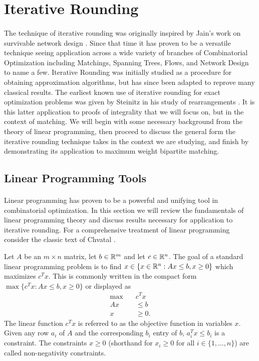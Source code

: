 \section{Iterative Rounding}
\paragraph{}
The technique of iterative rounding was originally inspired by Jain's work on survivable network design \cite{jain2001factor}. Since that time it has proven to be a versatile technique seeing application across a wide variety of branches of Combinatorial Optimization including Matchings, Spanning Trees, Flows, and Network Design \cite{lau2011iterative} to name a few. Iterative Rounding was initially studied as a procedure for obtaining approximation algorithms, but has since been adapted to reprove many classical results. The earliest known use of iterative rounding for exact optimization problems was given by Steinitz in his study of rearrangements \cite{steinitz1913bedingt}. It is this latter application to proofs of integrality that we will focus on, but in the context of matching. We will begin with some necessary background from the theory of linear programming, then proceed to discuss the general form the iterative rounding technique takes in the context we are studying, and finish by demonstrating its application to maximum weight bipartite matching.
\subsection{Linear Programming Tools}\label{IR:LP}
\paragraph{}
Linear programming has proven to be a powerful and unifying tool in combinatorial optimization. In this section we will review the fundamentals of linear programming theory and discuss results necessary for application to iterative rounding. For a comprehensive treatment of linear programming consider the classic text of Chvatal \cite{chvatal1983linear}.
\begin{definition}
Let $A$ be an $m \times n$ matrix, let $b \in \mathbb{R}^m$ and let $c \in \mathbb{R}^n$. The goal of a standard linear programming problem is to find $x \in \{x \in \mathbb{R}^n : Ax \leq b, x \geq 0 \}$ which maximizes $c^Tx$. This is commonly written in the compact form $\max\{c^Tx : Ax \leq b, x \geq 0 \}$ or displayed as
\begin{align*}
\max\quad &c^Tx \\
Ax &\leq b \\
x &\geq 0.
\end{align*}
The linear function $c^Tx$ is referred to as the objective function in variables $x$. Given any row $a_i$ of $A$ and the corresponding $b_i$ entry of $b$, $a_i^Tx \leq b_i$ is a constraint. The constraints $x \geq 0$ (shorthand for $x_i \geq 0$ for all $i \in \{1, \dots, n\}$) are called non-negativity constraints. 
\end{definition}
